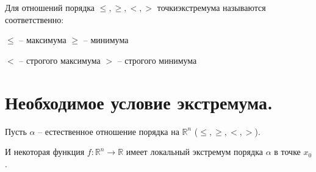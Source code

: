 \begin{ftdef}
Для отношений порядка $\leq, \geq, <, >$ точки\linebreak экстремума называются соответственно:

$\leq$ -- максимума
$\geq$ -- минимума

$<$ -- строгого максимума
$>$ -- строгого минимума

\end{ftdef}
\section{Необходимое условие экстремума.}
\parindent=0cm
Пусть $\alpha$ -- естественное отношение порядка на $\mathbb{R}^n$ ($\leq, \geq, <, >$).

И некоторая функция $f: \mathbb{R}^n \to \mathbb{R}$ имеет локальный экстремум порядка $\alpha$ в точке $x_0$.

